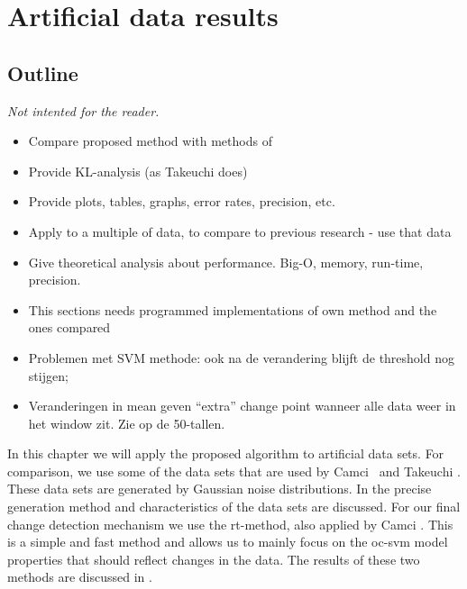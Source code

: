 
\chapter{Artificial data results}

\label{Chapter5} %


\section{Outline}
\emph{Not intented for the reader.}
\begin{itemize}
  \item Compare proposed method with methods of 
  \item Provide KL-analysis (as Takeuchi does)
  \item Provide plots, tables, graphs, error rates, precision, etc.
  \item Apply to a multiple of data, to compare to previous research - use that data
  \item Give theoretical analysis about performance. Big-O, memory, run-time, precision.
  \item This sections needs programmed implementations of own method and the ones compared
\end{itemize}

\begin{itemize}
  \item Problemen met SVM methode: ook na de verandering blijft de threshold nog stijgen;
  \item Veranderingen in mean geven ``extra'' change point wanneer alle data weer in het window zit. Zie  op de 50-tallen.
\end{itemize}

In this chapter we will apply the proposed algorithm to artificial data sets.
For comparison, we use some of the data sets that are used by Camci~\cite{camci2010change} and Takeuchi \etal \cite{takeuchi2006unifying}.
These data sets are generated by Gaussian noise distributions.
In  the precise generation method and characteristics of the data sets are discussed.
For our final change detection mechanism we use the \gls{rt}-method, also applied by Camci \cite{camci2010change}.
This is a simple and fast method and allows us to mainly focus on the \gls{oc-svm} model properties that should reflect changes in the data.
The results of these two methods are discussed in .




